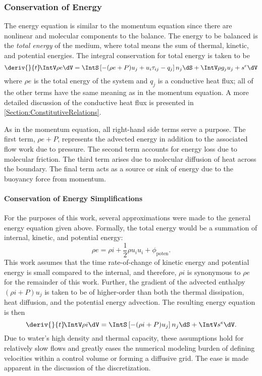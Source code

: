 \subsubsection{Conservation of Energy}
The energy equation is similar to the momentum equation since there are nonlinear and molecular components to the balance.
The energy to be balanced is the \textit{total energy} of the medium, where total means the sum of thermal, kinetic, and potential energies.
The integral conservation for total energy is taken to be
\begin{equation}
   \deriv{}{t}\! \IntV \rho e \dV = \IntS \left[- (\rho{e} + P) u_j + u_i \tau_{ij} - q_j\right] n_j\dS + \IntV \rho g_j u_j + s^e \dV
    \label{Eqn:IntegralCoE}
\end{equation}
where $\rho{e}$ is the total energy of the system and $q_j$ is a conductive heat flux; all of the other terms have the same meaning as in the momentum equation.
A more detailed discussion of the conductive heat flux is presented in \cref{Section:ConstitutiveRelations}.

As in the momentum equation, all right-hand side terms serve a purpose.
The first term, $\rho{e} + P$, represents the advected energy in addition to the associated flow work due to pressure.
The second term accounts for energy loss due to molecular friction.
The third term arises due to molecular diffusion of heat across the boundary.
The final term acts as a source or sink of energy due to the buoyancy force from momentum.


\paragraph{Conservation of Energy Simplifications}

For the purposes of this work, several approximations were made to the general energy equation given above.  Formally, the total energy would be a summation of internal, kinetic, and potential energy:
\begin{equation}
    \rho e = \rho i + \frac{1}{2}\rho u_i u_i + \phi_{\text{poten}}.
\end{equation}
This work assumes that the time rate-of-change of kinetic energy and potential energy is small compared to the internal, and therefore, $\rho i$ is synonymous to $\rho e$ for the remainder of this work.
Further, the gradient of the advected enthalpy $(\rho i + P)u_j$ is taken to be of higher-order than both the thermal dissipation, heat diffusion, and the potential energy advection.
The resulting energy equation is then 
\begin{equation}
    \deriv{}{t}\! \IntV \rho i \dV = \IntS \left[- (\rho{i} + P) u_j\right] n_j\dS + \IntV s^e \dV.
\end{equation}
Due to water's high density and thermal capacity, these assumptions hold for relatively slow flows and greatly eases the numerical modeling burden of defining velocities within a control volume or forming a diffusive grid.
The ease is made apparent in the discussion of the discretization.



